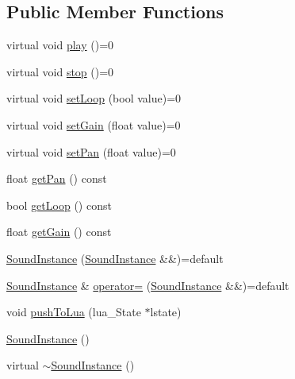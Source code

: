 \subsection*{Public Member Functions}
\begin{DoxyCompactItemize}
\item 
virtual void \hyperlink{classZeta_1_1SoundInstance_a9c0c29e0bd01fbd1ae9704153ee061d4}{play} ()=0
\item 
virtual void \hyperlink{classZeta_1_1SoundInstance_ac373cb282c51c26b715568e5dbd28afe}{stop} ()=0
\item 
virtual void \hyperlink{classZeta_1_1SoundInstance_ab0223c560591b60ff283893c518b28b1}{set\+Loop} (bool value)=0
\item 
virtual void \hyperlink{classZeta_1_1SoundInstance_ad12e077da7bb16115ebff1405353834d}{set\+Gain} (float value)=0
\item 
virtual void \hyperlink{classZeta_1_1SoundInstance_a34b3034515461fd964bba4221ac56a29}{set\+Pan} (float value)=0
\item 
float \hyperlink{classZeta_1_1SoundInstance_af7af15c981c0f6230dcbb05eb1ad8586}{get\+Pan} () const 
\item 
bool \hyperlink{classZeta_1_1SoundInstance_a1fee274c2701140ba7d84c4c0163c042}{get\+Loop} () const 
\item 
float \hyperlink{classZeta_1_1SoundInstance_a8907cccaf49f73bffb6b48bbc60b9556}{get\+Gain} () const 
\item 
\hyperlink{classZeta_1_1SoundInstance_a5f03830c771b1ef79829f89bf5986806}{Sound\+Instance} (\hyperlink{classZeta_1_1SoundInstance}{Sound\+Instance} \&\&)=default
\item 
\hyperlink{classZeta_1_1SoundInstance}{Sound\+Instance} \& \hyperlink{classZeta_1_1SoundInstance_a94f956d0fd08725a3d1117be47ba78c1}{operator=} (\hyperlink{classZeta_1_1SoundInstance}{Sound\+Instance} \&\&)=default
\item 
void \hyperlink{classZeta_1_1SoundInstance_a8c6ae7df7fbd5a602bec4a80f40a6ccd}{push\+To\+Lua} (lua\+\_\+\+State $\ast$lstate)
\item 
\hyperlink{classZeta_1_1SoundInstance_a375ece8ce8d33105bc37d25d0aecf178}{Sound\+Instance} ()
\item 
virtual \hyperlink{classZeta_1_1SoundInstance_a56d82d0c43f4153b1e15ee8df123bc5e}{$\sim$\+Sound\+Instance} ()
\end{DoxyCompactItemize}
